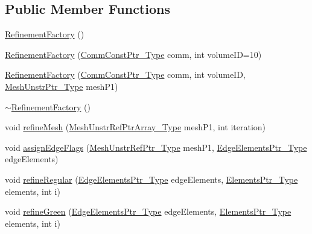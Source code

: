 \subsection*{Public Member Functions}
\begin{DoxyCompactItemize}
\item 
\hyperlink{classFEDD_1_1RefinementFactory_a45a83da1b5be5f4bcb091cf56caca25e}{Refinement\+Factory} ()
\item 
\hyperlink{classFEDD_1_1RefinementFactory_a0815e8208b193e64c26e64d94691a967}{Refinement\+Factory} (\hyperlink{classFEDD_1_1RefinementFactory_a58381e0786c65ec61d11bc73c224b45a}{Comm\+Const\+Ptr\+\_\+\+Type} comm, int volume\+ID=10)
\item 
\hyperlink{classFEDD_1_1RefinementFactory_a59e3730c7f4ee1769e34da85250d0d86}{Refinement\+Factory} (\hyperlink{classFEDD_1_1RefinementFactory_a58381e0786c65ec61d11bc73c224b45a}{Comm\+Const\+Ptr\+\_\+\+Type} comm, int volume\+ID, \hyperlink{classFEDD_1_1RefinementFactory_a1a278d01c278972af01f2996247af8ac}{Mesh\+Unstr\+Ptr\+\_\+\+Type} mesh\+P1)
\item 
\hyperlink{classFEDD_1_1RefinementFactory_ae9b8ba9b12e35db03ef1b6363c1b9200}{$\sim$\+Refinement\+Factory} ()
\item 
void \hyperlink{classFEDD_1_1RefinementFactory_aec49fcc71406ba48eb7d6766653914d5}{refine\+Mesh} (\hyperlink{classFEDD_1_1RefinementFactory_af6e25bbcc6f5e8d6ee70a1c5aab1e3eb}{Mesh\+Unstr\+Ref\+Ptr\+Array\+\_\+\+Type} mesh\+P1, int iteration)
\item 
void \hyperlink{classFEDD_1_1RefinementFactory_af7a24f2ea3ebe601eb6359b1b0bbc9a7}{assign\+Edge\+Flags} (\hyperlink{classFEDD_1_1RefinementFactory_aea0fab96821387bc772333299102b2c9}{Mesh\+Unstr\+Ref\+Ptr\+\_\+\+Type} mesh\+P1, \hyperlink{classFEDD_1_1RefinementFactory_ae5285e990ec4632d6188a1280627ad13}{Edge\+Elements\+Ptr\+\_\+\+Type} edge\+Elements)
\item 
void \hyperlink{classFEDD_1_1RefinementFactory_a530ccd6a31c259515ab1900d544eb813}{refine\+Regular} (\hyperlink{classFEDD_1_1RefinementFactory_ae5285e990ec4632d6188a1280627ad13}{Edge\+Elements\+Ptr\+\_\+\+Type} edge\+Elements, \hyperlink{classFEDD_1_1RefinementFactory_a0994b5b7b6d080048673941251999f2e}{Elements\+Ptr\+\_\+\+Type} elements, int i)
\item 
void \hyperlink{classFEDD_1_1RefinementFactory_a130f21212d5edaad2dc8f809a2628f2a}{refine\+Green} (\hyperlink{classFEDD_1_1RefinementFactory_ae5285e990ec4632d6188a1280627ad13}{Edge\+Elements\+Ptr\+\_\+\+Type} edge\+Elements, \hyperlink{classFEDD_1_1RefinementFactory_a0994b5b7b6d080048673941251999f2e}{Elements\+Ptr\+\_\+\+Type} elements, int i)

\end{DoxyCompactItemize}
